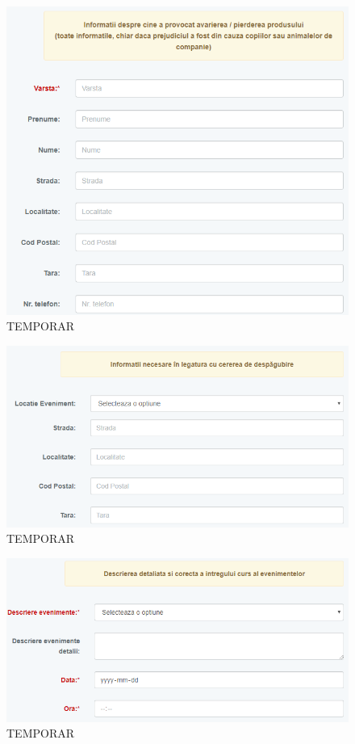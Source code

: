 	\begin{figure}
		\includegraphics[width=\linewidth]{../imagini/register_avariator.png}
		\caption{TEMPORAR}
		\label{fig:TEMP}
	\end{figure}
	\begin{figure}
		\includegraphics[width=\linewidth]{../imagini/register_cerere_despagubire.png}
		\caption{TEMPORAR}
		\label{fig:TEMP}
	\end{figure}
	\begin{figure}
		\includegraphics[width=\linewidth]{../imagini/register_decurs.png}
		\caption{TEMPORAR}
		\label{fig:TEMP}
	\end{figure}
